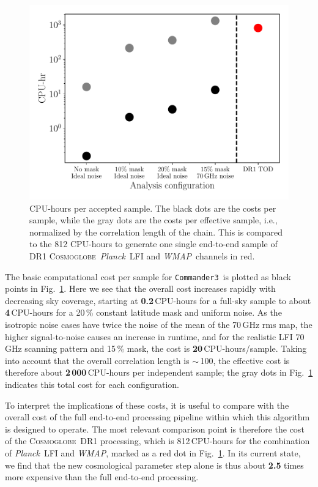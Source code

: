 \documentclass[twocolumn]{aa}
\def\WMAP{\emph{WMAP}}
\def\wmap{\emph{WMAP}}
\def\planck{\emph{Planck}}
\def\Planck{\emph{Planck}}
\def\commanderthree{\texttt{Commander3}}
\newcommand{\cosmoglobe}{\textsc{Cosmoglobe}}
\begin{document}
\begin{figure}
	\centering
	\includegraphics[width=\linewidth]{figures/run_time_release.pdf}
	\caption{\label{fig:runtime}CPU-hours per accepted sample. The black dots are the costs per sample, while the gray dots are the costs per effective sample, i.e., normalized by the correlation length of the chain. This is compared to the 812 CPU-hours to generate one single end-to-end sample of DR1  \cosmoglobe\ \planck\ LFI and \wmap\ channels in red.}
\end{figure}

The basic computational cost per sample for \commanderthree\ is plotted as black points in Fig.~\ref{fig:runtime}. Here we see that the overall cost increases rapidly with decreasing sky coverage, starting at \textbf{0.2}\,CPU-hours for a full-sky sample to about \textbf{4}\,CPU-hours for a 20\,\% constant latitude mask and uniform noise. As the isotropic noise cases have twice the noise of the mean of the 70\,GHz rms map, the higher signal-to-noise causes an increase in runtime, and for the realistic LFI 70\,GHz scanning pattern and 15\,\% mask, the cost is \textbf{20}\,CPU-hours/sample. Taking into account that the overall correlation length is $\sim$\,100, the effective cost is therefore about \textbf{2\,000}\,CPU-hours per independent sample; the gray dots in Fig.~\ref{fig:runtime} indicates this total cost for each configuration.

To interpret the implications of these costs, it is useful to compare with the overall cost of the full end-to-end processing pipeline within which this algorithm is designed to operate. The most relevant comparison point is therefore the cost of the \cosmoglobe\ DR1 processing, which is 812\,CPU-hours for the combination of \Planck\ LFI and \WMAP, marked as a red dot in Fig.~\ref{fig:runtime}. In its current state, we find that the new cosmological parameter step alone is thus about \textbf{2.5} times more expensive than the full end-to-end processing.
\end{document}

